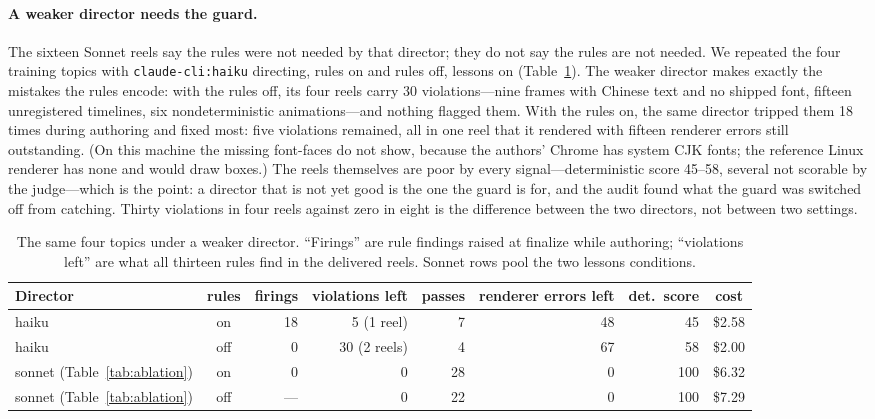 \documentclass[11pt]{article}
\begin{document}
\paragraph{A weaker director needs the guard.} The sixteen Sonnet reels say the rules were not needed
by that director; they do not say the rules are not needed. We repeated the four training topics with
\texttt{claude-cli:haiku} directing, rules on and rules off, lessons on (Table~\ref{tab:haiku}). The
weaker director makes exactly the mistakes the rules encode: with the rules off, its four reels carry
30 violations---nine frames with Chinese text and no shipped font, fifteen unregistered timelines, six
nondeterministic animations---and nothing flagged them. With the rules on, the same director tripped
them 18 times during authoring and fixed most: five violations remained, all in one reel that it
rendered with fifteen renderer errors still outstanding. (On this machine the missing font-faces do
not show, because the authors' Chrome has system CJK fonts; the reference Linux renderer has none and
would draw boxes.) The reels themselves are poor by every signal---deterministic score 45--58, several
not scorable by the judge---which is the point: a director that is not yet good is the one the guard is
for, and the audit found what the guard was switched off from catching. Thirty violations in four
reels against zero in eight is the difference between the two directors, not between two settings.

\begin{table}[t]
\centering\small
\begin{tabular}{lcrrrrrc}
\toprule
Director & rules & firings & violations left & passes & renderer errors left & det.\ score & cost \\
\midrule
haiku & on & 18 & 5 (1 reel) & 7 & 48 & 45 & \$2.58 \\
haiku & off & 0 & 30 (2 reels) & 4 & 67 & 58 & \$2.00 \\
sonnet (Table~\ref{tab:ablation}) & on & 0 & 0 & 28 & 0 & 100 & \$6.32 \\
sonnet (Table~\ref{tab:ablation}) & off & --- & 0 & 22 & 0 & 100 & \$7.29 \\
\bottomrule
\end{tabular}
\caption{The same four topics under a weaker director. ``Firings'' are rule findings raised at finalize
while authoring; ``violations left'' are what all thirteen rules find in the delivered reels. Sonnet
rows pool the two lessons conditions.}
\label{tab:haiku}
\end{table}
\end{document}
